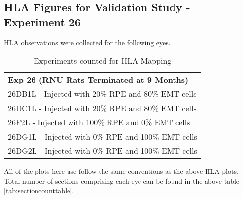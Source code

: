 \documentclass{article}
\begin{document}
\subsection{HLA Figures for Validation Study - Experiment 26}
HLA observations were collected for the following eyes.
\begin{table}[]
\centering
\begin{tabular}{l}
\textbf{Exp 26 (RNU Rats Terminated at 9 Months) } \\
26DB1L -  Injected with 20\% RPE and 80\% EMT cells \\
26DC1L - Injected with 20\% RPE and 80\% EMT cells \\
26F2L - Injected with 100\% RPE and 0\% EMT cells \\
26DG1L -  Injected with 0\% RPE and 100\% EMT cells  \\
26DG2L -  Injected with 0\% RPE and 100\% EMT cells\\
\end{tabular}
\caption{Experiments counted for HLA Mapping}
\label{tab:exp26}
\end{table}

All of the plots here use follow the same conventions as the above HLA plots. Total number of sections comprising each eye can be found in the above table \ref{tab:sectioncounttable}.
\end{document}
